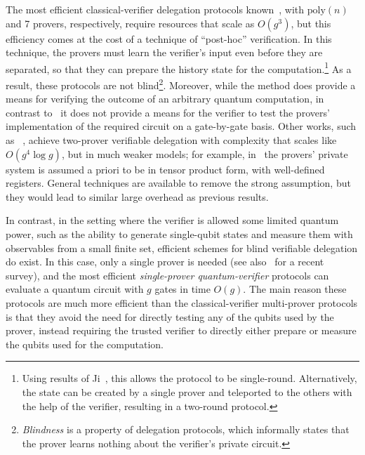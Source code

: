 \documentclass[11pt]{article}
\theoremstyle{remark}
\theoremstyle{definition}
\begin{document}
The most efficient classical-verifier delegation protocols known~\cite{hajdusek2015posthoc, natarajan2016robust}, with $\mathrm{poly}(n)$ and 7 provers, respectively,
require resources that scale as $O(g^3)$, but this efficiency comes at the cost of a technique of ``post-hoc''
verification. In this technique, the provers must learn the
verifier's input even before they are separated, so that they can prepare the
history state for the computation.\footnote{Using results of Ji~\cite{Ji16},
this allows the protocol to be single-round. Alternatively, the state can be created by a single prover and teleported to the others with the help of the verifier, resulting in a two-round protocol.} As a result, these protocols are not blind\footnote{
\emph{Blindness} is a property of delegation protocols, which informally states that the prover learns nothing about the verifier's private circuit.}. 
Moreover, while the method does provide a means for verifying the outcome
of an arbitrary quantum computation, in contrast
to~\cite{reichardt2012classical} it does not provide a means for the verifier to test the provers' implementation of the
required circuit on a gate-by-gate basis. 
Other works, such as ~\cite{HayashiH16},
achieve two-prover verifiable delegation with complexity that scales like $O(g^4\log g)$,  but in much weaker models; for example, in~\cite{HayashiH16} the provers' private system is assumed a priori to be in tensor product form, with well-defined registers.  General techniques are available to remove the strong assumption, but they would lead to similar large overhead as previous results.

In contrast, in the setting where the verifier is allowed some limited quantum power, such as the ability to generate single-qubit states and measure them with observables from a small finite set, efficient schemes for blind verifiable delegation do exist. In this case, only a single prover is needed \cite{aharonov10qpip,fitzsimons12vubqc,Morimae14,broadbent15howtoverify,HayashiM15, MF16, FujiiH17, MorimaeTH17} (see also~\cite{fitzsimons2016survey} for a recent survey), and the most efficient \emph{single-prover quantum-verifier} protocols can evaluate a quantum circuit with $g$ gates in time $O(g)$. The main reason these protocols are much more efficient than the classical-verifier multi-prover protocols is that they avoid the need for directly testing any of the qubits used by the prover, instead requiring the trusted verifier to directly either prepare or measure the qubits used for the computation. 
\end{document}
